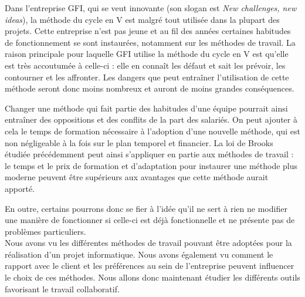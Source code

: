 \begin{app}
Dans l'entreprise GFI, qui se veut innovante (son slogan est \textit{New challenges, new ideas}), la méthode du cycle en V est malgré tout utilisée dans la plupart des projets. Cette entreprise n'est pas jeune et au fil des années certaines habitudes de fonctionnement se sont instaurées, notamment sur les méthodes de travail. La raison principale pour laquelle GFI utilise la méthode du cycle en V est qu'elle est très accoutumée à celle-ci : elle en connaît les défaut et sait les prévoir, les contourner et les affronter. Les dangers que peut entraîner l'utilisation de cette méthode seront donc moins nombreux et auront de moins grandes conséquences.
\end{app}

Changer une méthode qui fait partie des habitudes d'une équipe pourrait ainsi entraîner des oppositions et des conflits de la part des salariés. On peut ajouter à cela le temps de formation nécessaire à l'adoption d'une nouvelle méthode, qui est non négligeable à la fois sur le plan temporel et financier. La loi de Brooks étudiée précédemment peut ainsi s'appliquer en partie aux méthodes de travail : le temps et le prix de formation et d'adaptation pour instaurer une méthode plus moderne peuvent être supérieurs aux avantages que cette méthode aurait apporté.

En outre, certains pourrons donc se fier à l'idée qu'il ne sert à rien ne modifier une manière de fonctionner si celle-ci est déjà fonctionnelle et ne présente pas de problèmes particuliers.\\

Nous avons vu les différentes méthodes de travail pouvant être adoptées pour la réalisation d'un projet informatique. Nous avons également vu comment le rapport avec le client et les préférences au sein de l'entreprise peuvent influencer le choix de ces méthodes. Nous allons donc maintenant étudier les différents outils favorisant le travail collaboratif.
